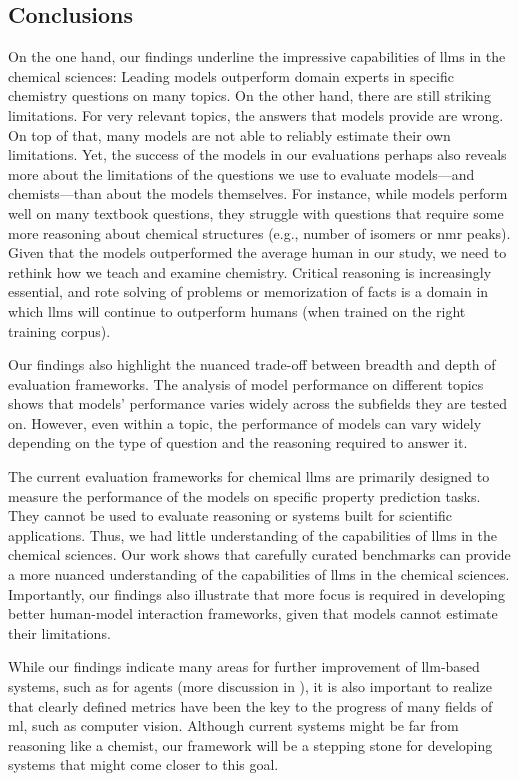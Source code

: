 \documentclass[11pt, oneside]{article}
\begin{document}
\begin{refsection}
\section{Conclusions}
On the one hand, our findings underline the impressive capabilities of \glspl{llm} in the chemical sciences: Leading models outperform domain experts in specific chemistry questions on many topics.
On the other hand, there are still striking limitations.
For very relevant topics, the answers that models provide are wrong.
On top of that, many models are not able to reliably estimate their own limitations.
Yet, the success of the models in our evaluations perhaps also reveals more about the limitations of the questions we use to evaluate models---and chemists---than about the models themselves.
For instance, while models perform well on many textbook questions, they struggle with questions that require some more reasoning about chemical structures (e.g., number of isomers or \gls{nmr} peaks).
Given that the models outperformed the average human in our study, we need to rethink how we teach and examine chemistry.
Critical reasoning is increasingly essential, and rote solving of problems or memorization of facts is a domain in which \glspl{llm} will continue to outperform humans (when trained on the right training corpus).

Our findings also highlight the nuanced trade-off between breadth and depth of evaluation frameworks.
The analysis of model performance on different topics shows that models' performance varies widely across the subfields they are tested on.
However, even within a topic, the performance of models can vary widely depending on the type of question and the reasoning required to answer it.

The current evaluation frameworks for chemical \glspl{llm} are primarily designed to measure the performance of the models on specific property prediction tasks.
They cannot be used to evaluate reasoning or systems built for scientific applications.
Thus, we had little understanding of the capabilities of \glspl{llm} in the chemical sciences.
Our work shows that carefully curated benchmarks can provide a more nuanced understanding of the capabilities of \glspl{llm} in the chemical sciences.
Importantly, our findings also illustrate that more focus is required in developing better human-model interaction frameworks, given that models cannot estimate their limitations.

While our findings indicate many areas for further improvement of \gls{llm}-based systems, such as for agents (more discussion in ), it is also important to realize that clearly defined metrics have been the key to the progress of many fields of \gls{ml}, such as computer vision.
Although current systems might be far from reasoning like a chemist, our \chembench framework will be a stepping stone for developing systems that might come closer to this goal.


\end{refsection}
\end{document}
